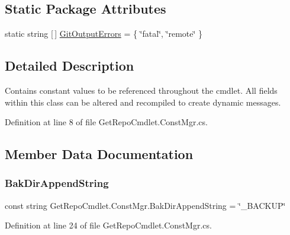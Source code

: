 \subsection*{Static Package Attributes}
\begin{DoxyCompactItemize}
\item 
static string \mbox{[}$\,$\mbox{]} \mbox{\hyperlink{class_get_repo_cmdlet_1_1_const_mgr_a6e8915c1332f79fc3dfb4d155953f5db}{Git\+Output\+Errors}} = \{ \char`\"{}fatal\char`\"{}, \char`\"{}remote\char`\"{} \}
\end{DoxyCompactItemize}


\subsection{Detailed Description}
Contains constant values to be referenced throughout the cmdlet. All fields within this class can be altered and recompiled to create dynamic messages. 



Definition at line 8 of file Get\+Repo\+Cmdlet.\+Const\+Mgr.\+cs.



\subsection{Member Data Documentation}
\mbox{\label{class_get_repo_cmdlet_1_1_const_mgr_ac59f0efc3a0397a54fd2c7c892253c56}} 
\subsubsection{\texorpdfstring{Bak\+Dir\+Append\+String}{BakDirAppendString}}
{\footnotesize\ttfamily const string Get\+Repo\+Cmdlet.\+Const\+Mgr.\+Bak\+Dir\+Append\+String = \char`\"{}\+\_\+\+B\+A\+C\+K\+UP\char`\"{}\hspace{0.3cm}{\ttfamily [package]}}



Definition at line 24 of file Get\+Repo\+Cmdlet.\+Const\+Mgr.\+cs.

\mbox{\label{class_get_repo_cmdlet_1_1_const_mgr_a951d1145e5596ce4613a38bc981f1961}} 
